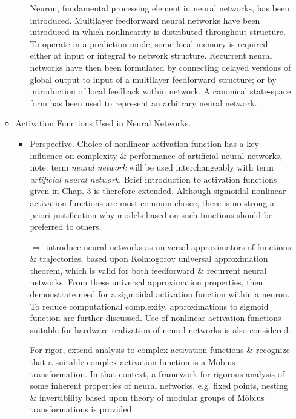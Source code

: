 \documentclass{article}
\begin{document}
\begin{enumerate}
\begin{itemize}
\begin{itemize}
			Neuron, fundamental processing element in neural networks, has been introduced. Multilayer feedforward neural networks have been introduced in which nonlinearity is distributed throughout structure. To operate in a prediction mode, some local memory is required either at input or integral to network structure. Recurrent neural networks have then been formulated by connecting delayed versions of global output to input of a multilayer feedforward structure; or by introduction of local feedback within network. A canonical state-space form has been used to represent an arbitrary neural network.		
		\end{itemize}
		\item {\sf Activation Functions Used in Neural Networks.}
		\begin{itemize}
			\item {\sf Perspective.} Choice of nonlinear activation function has a key influence on complexity \& performance of artificial neural networks, note: term {\it neural network} will be used interchangeably with term {\it artificial neural network}. Brief introduction to activation functions given in Chap. 3 is therefore extended. Although sigmoidal nonlinear activation functions are most common choice, there is no strong a priori justification why models based on such functions should be preferred to others.
			
			$\Rightarrow$ introduce neural networks as universal approximators of functions \& trajectories, based upon Kolmogorov universal approximation theorem, which is valid for both feedforward \& recurrent neural networks. From these universal approximation properties, then demonstrate need for a sigmoidal activation function within a neuron. To reduce computational complexity, approximations to sigmoid function are further discussed. Use of nonlinear activation functions suitable for hardware realization of neural networks is also considered.
			
			For rigor, extend analysis to complex activation functions \& recognize that a suitable complex activation function is a M\"obius transformation. In that context, a framework for rigorous analysis of some inherent properties of neural networks, e.g. fixed points, nesting \& invertibility based upon theory of modular groups of M\"obius transformations is provided.
			

\end{itemize}
\end{itemize}
\end{enumerate}
\end{document}
